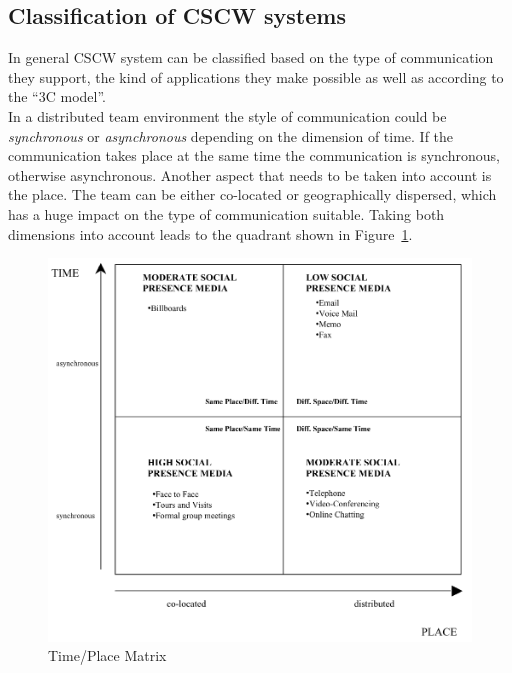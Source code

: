 
\subsection{Classification of \gls{CSCW} systems}
\label{sec:cscw_types}

In general \gls{CSCW} system can be classified based on the type of communication they support, the kind of applications they make possible as well as according to the ``3C model''. \\

In a distributed team environment the style of communication could be \emph{synchronous} or \emph{asynchronous} depending on the dimension of time. If the communication takes place at the same time the communication is synchronous, otherwise asynchronous. Another aspect that needs to be taken into account is the place. The team can be either co-located or geographically dispersed, which has a huge impact on the type of communication suitable. Taking both dimensions into account leads to the quadrant shown in Figure~\ref{fig:images_cscw_time_place_matrix}. \\

\begin{figure}[!ht]
 \centering
 \includegraphics[width=0.9\columnwidth]{images/time_place_matrix.png}
 \caption[Time/Place Matrix]{Time/Place Matrix \citep{robert2005paradox}}
\label{fig:images_cscw_time_place_matrix}
\end{figure}

